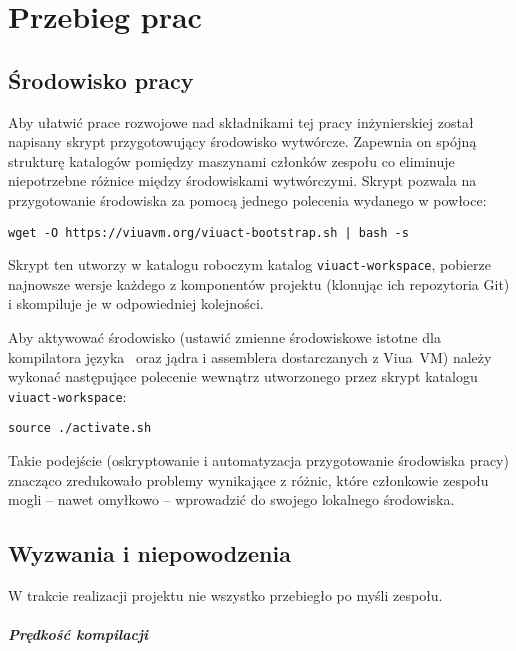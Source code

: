 \chapter{Przebieg prac}
\label{przebieg_prac}

\section*{Środowisko pracy}

Aby ułatwić prace rozwojowe nad składnikami tej pracy inżynierskiej został
napisany skrypt przygotowujący środowisko wytwórcze. Zapewnia on spójną
strukturę katalogów pomiędzy maszynami członków zespołu co eliminuje
niepotrzebne różnice między środowiskami wytwórczymi. Skrypt pozwala na
przygotowanie środowiska za pomocą jednego polecenia wydanego w powłoce:
\begin{lstlisting}
wget -O https://viuavm.org/viuact-bootstrap.sh | bash -s
\end{lstlisting}

Skrypt ten utworzy w katalogu roboczym katalog \texttt{viuact-workspace},
pobierze najnowsze wersje każdego z komponentów projektu (klonując ich
repozytoria Git) i skompiluje je w odpowiedniej kolejności.

Aby aktywować środowisko (ustawić zmienne środowiskowe istotne dla kompilatora
języka \ViuAct\ oraz jądra i assemblera dostarczanych z Viua~VM) należy wykonać
następujące polecenie wewnątrz utworzonego przez skrypt katalogu
\texttt{viuact-workspace}:
\begin{lstlisting}
source ./activate.sh
\end{lstlisting}

Takie podejście (oskryptowanie i automatyzacja przygotowanie środowiska pracy)
znacząco zredukowało problemy wynikające z różnic, które członkowie zespołu
mogli -- nawet omyłkowo -- wprowadzić do swojego lokalnego środowiska.







\section{Wyzwania i niepowodzenia}

W trakcie realizacji projektu nie wszystko przebiegło po myśli zespołu.

\paragraph*{Prędkość kompilacji}

